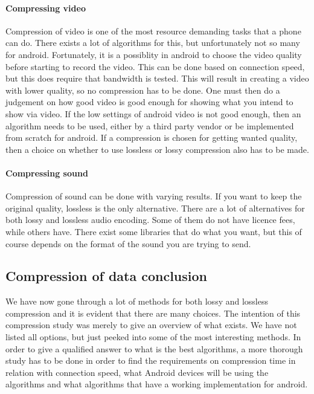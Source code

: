 \newpage

\paragraph{Compressing video} \hfill
\newline
Compression of video is one of the most resource demanding tasks that a phone can do. There exists a lot of algorithms for this, but unfortunately not so many for android. Fortunately, it is a possiblity in android to choose the video quality before starting to record the video. This can be done based on connection speed, but this does require that bandwidth is tested. This will result in creating a video with lower quality, so no compression has to be done. One must then do a judgement on how good video is good enough for showing what you intend to show via video. If the low settings of android video is not good enough, then an algorithm needs to be used, either by a third party vendor or be implemented from scratch for android. If a compression is chosen for getting wanted quality, then a choice on whether to use lossless or lossy compression also has to be made.

\paragraph{Compressing sound}\hfill
\newline
Compression of sound can be done with varying results. If you want to keep the original quality, lossless is the only alternative. There are a lot of alternatives for both lossy and lossless audio encoding. Some of them do not have licence fees, while others have. There exist some libraries that do what you want, but this of course depends on the format of the sound you are trying to send.

\subsection{Compression of data conclusion}
We have now gone through a lot of methods for both lossy and lossless compression and it is evident that there are many choices. The intention of this compression study was merely to give an overview of what exists. We have not listed all options, but just peeked into some of the most interesting methods. In order to give a qualified answer to what is the best algorithms, a more thorough study has to be done in order to find the requirements on compression time in relation with connection speed, what Android devices will be using the algorithms and what algorithms that have a working implementation for android.  








